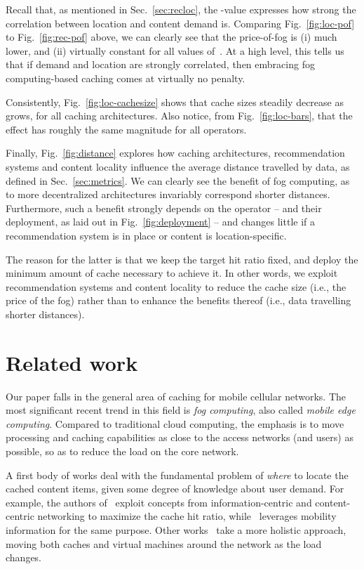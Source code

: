 \documentclass{sig-alternate-05-2015}
\newcommand{\Fig}[1]{Fig.~\ref{fig:#1}}
\newcommand{\Sec}[1]{Sec.~\ref{sec:#1}}
\begin{document}
Recall that, as mentioned in \Sec{recloc}, the -value expresses how strong the correlation between location and content demand is. Comparing \Fig{loc-pof} to \Fig{rec-pof} above, we can clearly see that the price-of-fog is (i) much lower, and (ii) virtually constant for all values of~. At a high level, this tells us that if demand and location are strongly correlated, then embracing  fog computing-based caching comes at virtually no penalty.

Consistently, \Fig{loc-cachesize} shows that cache sizes steadily decrease as~ grows, for all caching architectures. Also notice, from \Fig{loc-bars}, that the effect has roughly the same magnitude for all operators.

Finally, \Fig{distance} explores how caching architectures, recommendation systems and content locality influence the average distance travelled by data, as defined in \Sec{metrics}. We can clearly see the benefit of fog computing, as to more decentralized architectures invariably correspond shorter distances. Furthermore, such a benefit strongly depends on the operator -- and their deployment, as laid out in \Fig{deployment} -- and changes little if a recommendation system is in place or content is location-specific.

The reason for the latter is that we keep the target hit ratio fixed, and deploy the minimum amount of cache necessary to achieve it. In other words, we exploit recommendation systems and content locality to reduce the cache size (i.e., the price of the fog) rather than to enhance the benefits thereof (i.e., data travelling shorter distances).

\section{Related work}
\label{sec:relwork}

Our paper falls in the general area of caching for mobile cellular networks. The most significant recent trend in this field is {\em fog computing}, also called {\em mobile edge computing}. Compared to traditional cloud computing, the emphasis is to move processing and caching capabilities as close to the access networks (and users) as possible, so as to reduce the load on the core network.

A first body of works deal with the fundamental problem of {\em where} to locate the cached content items, given some degree of knowledge about user demand. For example, the authors of~\cite{commag-air,icn15} exploit concepts from information-centric and content-centric networking to maximize the cache hit ratio, while~\cite{mobaware} leverages mobility information for the same purpose. Other works~\cite{moving} take a more holistic approach, moving both caches and virtual machines around the network as the load changes.
\end{document}
